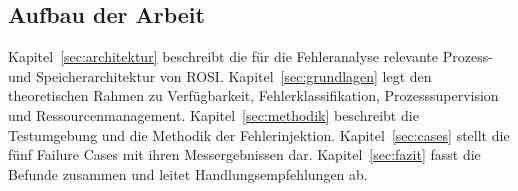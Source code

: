 \subsection{Aufbau der Arbeit}
\label{sec:aufbau}

Kapitel~\ref{sec:architektur} beschreibt die für die Fehleranalyse relevante Prozess- und
Speicherarchitektur von ROSI. Kapitel~\ref{sec:grundlagen} legt den theoretischen Rahmen zu
Verfügbarkeit, Fehlerklassifikation, Prozesssupervision und Ressourcenmanagement.
Kapitel~\ref{sec:methodik} beschreibt die Testumgebung und die Methodik der Fehlerinjektion.
Kapitel~\ref{sec:cases} stellt die fünf Failure Cases mit ihren Messergebnissen dar.
Kapitel~\ref{sec:fazit} fasst die Befunde zusammen und leitet Handlungsempfehlungen ab.
